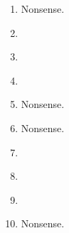 \begin{exercise}{13}
  \begin{enumerate}
    \item Nonsense. \\
    \item {} \\
    \item {} \\
    \item {} \\
    \item Nonsense. \\
    \item Nonsense. \\
    \item {} \\
    \item {} \\
    \item {} \\
    \item Nonsense.
  \end{enumerate}
\end{exercise}

\begin{exercise}{18}
\end{exercise}

\begin{exercise}{19}
\end{exercise}

\begin{exercise}{20}
\end{exercise}
